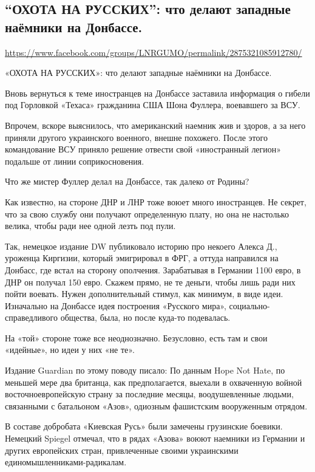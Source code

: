  
 
\subsection{``ОХОТА НА РУССКИХ'': что делают западные наёмники на Донбассе.}
\label{sec:25_07_2020.fb.lnr.2}
\url{https://www.facebook.com/groups/LNRGUMO/permalink/2875321085912780/}

«ОХОТА НА РУССКИХ»: что делают западные наёмники на Донбассе.

Вновь вернуться к теме иностранцев на Донбассе заставила информация о гибели
под Горловкой «Техаса» гражданина США Шона Фуллера, воевавшего за ВСУ.

Впрочем, вскоре выяснилось, что американский наемник жив и здоров, а за него
приняли другого украинского военного, внешне похожего.  После этого
командование ВСУ приняло решение отвести свой «иностранный легион» подальше от
линии соприкосновения.

Что же мистер Фуллер делал на Донбассе, так далеко от Родины?

Как известно, на стороне ДНР и ЛНР тоже воюет много иностранцев.  Не секрет,
что за свою службу они получают определенную плату, но она не настолько велика,
чтобы ради нее одной лезть под пули.

Так, немецкое издание DW публиковало историю про некоего Алекса Д., уроженца
Киргизии, который эмигрировал в ФРГ, а оттуда направился на Донбасс, где встал
на сторону ополчения. Зарабатывая в Германии 1100 евро, в ДНР он получал 150
евро. Скажем прямо, не те деньги, чтобы лишь ради них пойти воевать.  Нужен
дополнительный стимул, как минимум, в виде идеи.  Изначально на Донбассе идея
построения «Русского мира», социально-справедливого общества, была, но после
куда-то подевалась.

На «той» стороне тоже все неоднозначно.  Безусловно, есть там и свои «идейные»,
но идеи у них «не те».

Издание Guardian по этому поводу писало: По данным Hope Not Hate, по меньшей
мере два британца, как предполагается, выехали в охваченную войной
восточноевропейскую страну за последние месяцы, воодушевленные людьми,
связанными с батальоном «Азов», одиозным фашистским вооруженным отрядом.

В составе добробата «Киевская Русь» были замечены грузинские боевики.  Немецкий
Spiegel отмечал, что в рядах «Азова» воюют наемники из Германии и других
европейских стран, привлеченные своими украинскими единомышленниками-радикалам.

